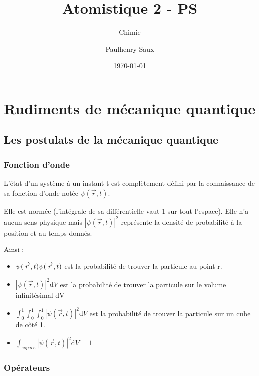 \documentclass[french]{yLectureNote}
\title{Atomistique 2 - PS}
\subtitle{Chimie}
\author{Paulhenry Saux}
\date{\today}
\renewcommand{\vec}{\overrightarrow}
\newcommand{\dd}{\mathrm{d}}
\newcommand{\fo}{\psi(\vec{r},t)}
\newcommand{\foe}{\psi(\vec{r},t)\*}
\begin{document}
\chapter{Rudiments de mécanique quantique}
\section{Les postulats de la mécanique quantique}
\subsection{Fonction d'onde}
\begin{theorem}[Postulat 1]
L'état d'un système à un instant t est complètement défini par la connaissance de sa fonction d'onde notée \(\fo\).
\end{theorem}
\begin{proposition}
Elle est normée (l'intégrale de sa différentielle vaut 1 sur tout l'espace). Elle n'a aucun sens physique mais \(|\fo|^2\) représente la densité de probabilité à la position et au temps donnés.
\end{proposition}
Ainsi :
\begin{itemize}
 \item \(\foe\fo\) est la probabilité de trouver la particule au point r.
 \item \(|\fo|^2\dd V\) est la probabilité de trouver la particule sur le volume infinitésimal dV
 \item \(\int_{0}^1\int_{0}^1\int_{0}^1 |\fo|^2\dd V\) est la probabilité de trouver la particule sur un cube de c\^oté 1.
 \item \(\int_{espace} |\fo|^2 \dd V = 1\)
\end{itemize}
\subsection{Opérateurs}
\end{document}
